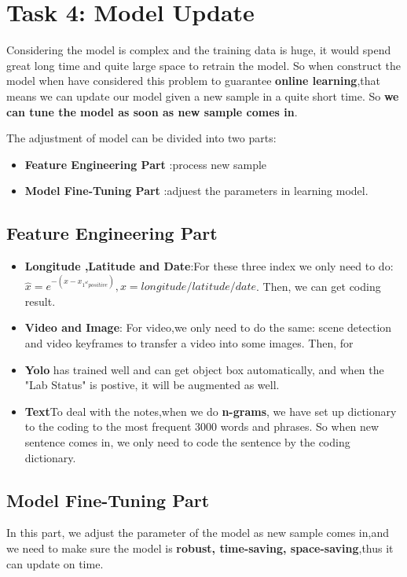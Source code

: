 \documentclass[12pt]{article}
\begin{document}
\section{Task 4: Model Update}
Considering the model is complex and the training data is huge, it would spend great long time and quite large space to retrain the model. So when construct the model when have considered this problem to guarantee \textbf{online learning},that means we can update our model given a new sample in a quite short time. So \textbf{we can tune the model as soon as new sample comes in}.

The adjustment of model can be divided into two parts:
\begin{itemize}
	\item \textbf{Feature Engineering Part} :process new sample
	\item \textbf{Model Fine-Tuning Part} :adjuest the parameters in learning model.
\end{itemize}
\subsection{Feature Engineering Part}
\begin{itemize}
	\item \textbf{Longitude ,Latitude and Date}:For these three index we only need to do: $\hat{x}=e^{-(x-x_{1^{st}positive})},x=longitude/latitude/date$. Then, we can get coding result.
	\item \textbf{Video and Image}: For video,we only need to do the same: scene detection and video keyframes to transfer a video into some images. Then, for
	\item \textbf{Yolo} has trained well and can get object box automatically, and when the "Lab Status" is postive, it will be augmented as well.
	\item \textbf{Text}To deal with the notes,when we do \textbf{n-grams}, we have set up dictionary to the coding to the most frequent 3000 words and phrases. So when new sentence comes in, we only need to code the sentence by the coding dictionary.
\end{itemize}


\subsection{Model Fine-Tuning Part}
In this part, we adjust the parameter of the model as new sample comes in,and we need to make sure the model is \textbf{robust, time-saving, space-saving},thus it can update on time.
\end{document}
